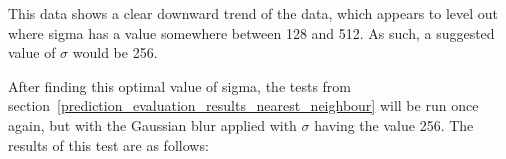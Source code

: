 
			This data shows a clear downward trend of the data, which appears to level out where sigma has a value somewhere between 128 and 512. As such, a suggested value of $\sigma$ would be 256. 

			After finding this optimal value of sigma, the tests from section~\ref{prediction_evaluation_results_nearest_neighbour} will be run once again, but with the Gaussian blur applied with $\sigma$ having the value 256. The results of this test are as follows:


